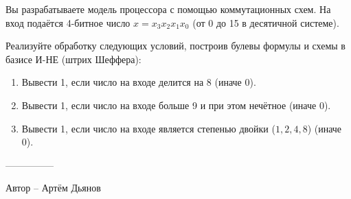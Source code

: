\question
Вы разрабатываете модель процессора с помощью коммутационных схем. На вход подаётся 4-битное число $x=x_3x_2x_1x_0$ (от 0 до 15 в десятичной системе).

Реализуйте обработку следующих условий, построив булевы формулы и схемы в базисе И-НЕ (штрих Шеффера):
\begin{enumerate}
\item Вывести 1, если число на входе делится на 8 (иначе 0).
\item Вывести 1, если число на входе больше 9 и при этом нечётное (иначе 0).
\item Вывести 1, если число на входе является степенью двойки ($1,2,4,8$) (иначе 0).
\end{enumerate}

---------------

Автор -- Артём Дьянов
